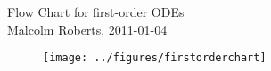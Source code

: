 \documentclass[12pt]{article}
\begin{document}
\pagestyle{empty}


\begin{center}
{\large  Flow Chart for first-order ODEs}
\\
\vspace{0.3cm}
{\small Malcolm Roberts, 2011-01-04}
\end{center}
\vspace{1cm}


\begin{figure}[h]
  \centering
  \texttt{[image: ../figures/firstorderchart]}
\end{figure}


 
\end{document}
